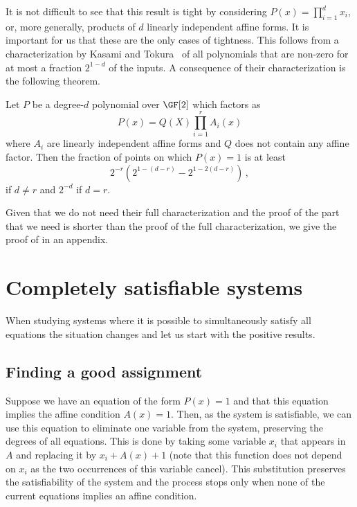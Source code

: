 It is not difficult to see that this result is
tight by considering $P(x)=\prod_{i=1}^dx_i$,
or, more generally, products of $d$ linearly independent
affine forms.  
It is important for us
that these are the only cases of tightness.
This follows from a characterization by Kasami
and Tokura~\cite{kt70} of all polynomials
that are non-zero for at most a fraction
$2^{1-d}$ of the inputs.  
A consequence of their characterization is
the following theorem. 

\begin{theorem}\label{basic theorem}
Let $P$ be a %
degree-$d$
polynomial
over $\GF[2]$ which factors
as
$$P(x)= Q(X) \prod_{i=1}^r A_i (x) 
$$
where $A_i$ are linearly independent
affine forms and $Q$ does not
contain any affine factor.
Then the fraction of points on which $P(x)=1$
is at least
$$
2^{-r} (2^{1-(d-r)}-2^{1-2(d-r)})\,,$$
if $d\not =r$ and $2^{-d}$ if $d=r$.
\end{theorem}

Given that we do not need their full characterization
and the proof of the part that we need is shorter
than the proof of the full characterization, we
give the proof of  in
an appendix.

\section{Completely satisfiable systems}\label{sec: p}

When studying systems where it is possible
to simultaneously satisfy all equations
the situation changes and let us start with
the positive results.

\subsection{Finding a good assignment}

Suppose we have an
equation of the form
$P(x)=1$ and that
this equation implies the affine
condition $A(x)=1$.  Then,
as the system is satisfiable,
we can use this equation to eliminate
one variable from the system, preserving the
degrees of all equations.  This is done
by taking some variable $x_i$ that appears
in $A$ and replacing it by $x_i+A(x)+1$ (note that
this function does not depend on $x_i$ as the two
occurrences of this variable cancel).
This substitution preserves the satisfiability of the
system and the process stops only 
when none of the current equations implies an affine condition.

